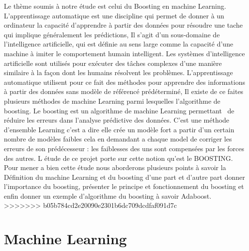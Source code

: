 \documentclass[french,a4paper,12pt]{article}
\begin{document}
\quad Le thème soumis à notre étude est celui du Boosting en machine Learning. L’apprentissage automatique est une discipline qui permet de donner à un ordinateur la capacité d’apprendre à partir des données pour résoudre une tache qui implique généralement les prédictions, Il s’agit d’un sous-domaine de l'intelligence artificielle, qui est définie au sens large comme la capacité d'une machine à imiter le comportement humain intelligent. Les systèmes d'intelligence artificielle sont utilisés pour exécuter des tâches complexes d'une manière similaire à la façon dont les humains résolvent les problèmes. L'apprentissage automatique utilisent pour ce fait des méthodes pour apprendre des informations à partir des données sans modèle de référencé prédéterminé, Il existe de ce faites plusieurs méthodes de machine Learning parmi lesquelles l’algorithme de boosting. Le boosting est un algorithme de machine Learning permettant \ de réduire les erreurs dans l’analyse prédictive des données. C’est une méthode d’ensemble Learning c’est a dire elle crée un modèle fort a partir d’un certain nombre de modèles faibles cela en demandant a chaque model de corriger les erreurs de son prédécesseur : les faiblesses des uns sont compensées par les forces des autres. L étude de ce projet porte sur cette notion qu’est le BOOSTING. Pour mener a bien cette étude nous aborderons plusieurs points à savoir la Définition du machine Learning et du boosting  d'une part et d'autre part donner l’importance du boosting, présenter le principe et fonctionnement du boosting et enfin donner  un exemple d’algorithme du boosting à savoir Adaboost. 
>>>>>>> b05b784cd2e20090e2301b6dc709dcdfaf091d7c




\newpage
\section{Machine Learning}
\end{document}
